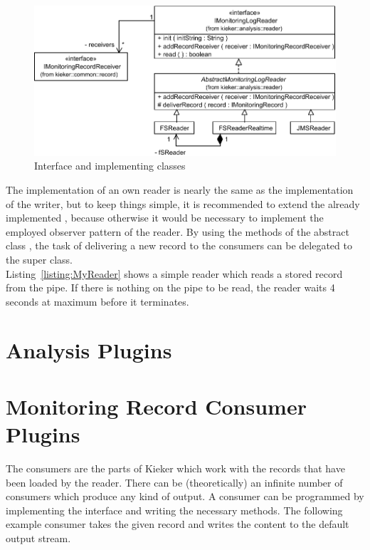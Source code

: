 \begin{figure}[H]\centering
\includegraphics[scale=0.7]{images/kieker_readerimplsuserguide-modified}
\caption{Interface  and implementing classes}
\label{Figure:ReaderHierarchy}
\end{figure}

\noindent The implementation of an own reader is nearly the same as the implementation of the writer, but to keep things simple, it is recommended to extend the already implemented , because otherwise it would be necessary to implement the employed observer pattern of the reader. By using the methods of the abstract class , the task of delivering a new record to the consumers can be delegated to the super class.\\
Listing~\ref{listing:MyReader} shows a simple reader which reads a stored record from the pipe. If there is nothing on the pipe to be read, the reader waits 4 seconds at maximum before it terminates.

\setJavaCodeListing


\section{Analysis Plugins}\label{sec:analysis:plugins}


\section{Monitoring Record Consumer Plugins}\label{sec:analysis:consumer}

The consumers are the parts of Kieker which work with the records that have been loaded by the reader. There can be (theoretically) an infinite number of consumers which produce any kind of output. A consumer can be programmed by implementing the interface  and writing the necessary methods. The following example consumer takes the given record and writes the content to the default output stream.

\setJavaCodeListing

